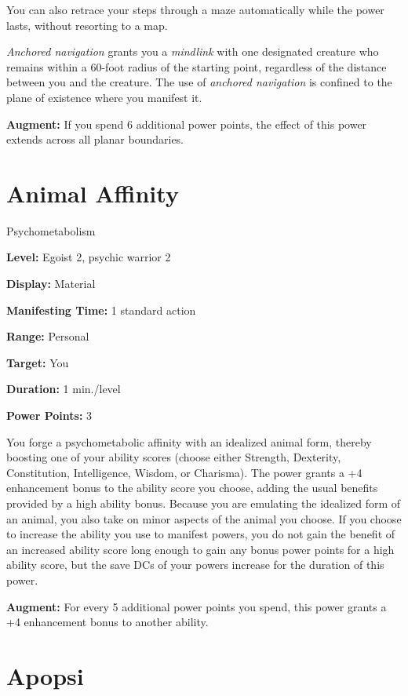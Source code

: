 \documentclass{article}
\begin{document}
You can also retrace your steps through a maze automatically while the power lasts, 
without resorting to a map.

\textit{Anchored navigation }grants you a \textit{mindlink }with one designated 
creature who remains within a 60-foot radius of the starting point, regardless 
of the distance between you and the creature. The use of \textit{anchored navigation 
}is confined to the plane of existence where you manifest it.

\textbf{Augment:} If you spend 6 additional power points, the effect of this power 
extends across all planar boundaries.

\vspace{12pt}
\section*{Animal Affinity}

Psychometabolism

\textbf{Level:} Egoist 2, psychic warrior 2

\textbf{Display:} Material

\textbf{Manifesting Time:} 1 standard action

\textbf{Range:} Personal

\textbf{Target:} You

\textbf{Duration:} 1 min./level

\textbf{Power Points:} 3

You forge a psychometabolic affinity with an idealized animal form, thereby boosting 
one of your ability scores (choose either Strength, Dexterity, Constitution, Intelligence, 
Wisdom, or Charisma). The power grants a +4 enhancement bonus to the ability score 
you choose, adding the usual benefits provided by a high ability bonus. Because 
you are emulating the idealized form of an animal, you also take on minor aspects 
of the animal you choose. If you choose to increase the ability you use to manifest 
powers, you do not gain the benefit of an increased ability score long enough to 
gain any bonus power points for a high ability score, but the save DCs of your 
powers increase for the duration of this power.

\textbf{Augment:} For every 5 additional power points you spend, this power grants 
a +4 enhancement bonus to another ability.

\vspace{12pt}
\section*{Apopsi}
\end{document}
